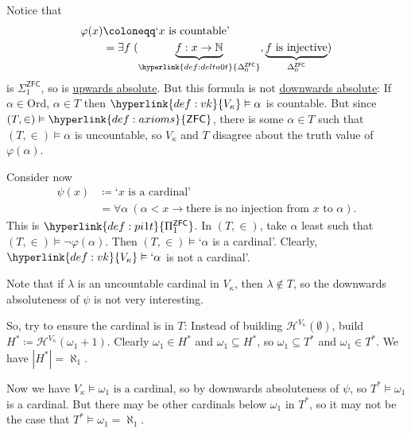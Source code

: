 \documentclass{article}
\newcommand{\1}{\mathbbm{1}}
\let\models\vDash
\begin{document}
Notice that
\begin{align*}
  \varphi(x) &\coloneqq \text{`}x \text{ is countable'} \\
             &= \exists f \; (\underbrace{f: x \to \mathbb{N}}_{\hyperlink{def:delta0t}{\Delta_0^{\textsf{ZFC}}}}, \underbrace{f \text{ is injective}}_{\Delta_0^\textsf{ZFC}})
\end{align*}
is \hyperlink{def:sig1t}{$\Sigma_1^{\textsf{ZFC}}$}, so is \hyperlink{def:abso}{upwards absolute}.
But this formula is not \hyperlink{def:abso}{downwards absolute}: If $\alpha \in \textrm{Ord}$, $\alpha \in T$ then $\hyperlink{def:vk}{V_\kappa} \models \alpha$ is countable.
But since $(T,\in) \models \hyperlink{def:axioms}{\textsf{ZFC}}$, there is some $\alpha \in T$ such that $(T,\in) \models \alpha$ is uncountable, so $V_\kappa$ and $T$ disagree about the truth value of $\varphi(\alpha)$.

Consider now
\begin{align*}
  \psi(x) &\coloneqq  \text{`}x \text{ is a cardinal'} \\
  &= \forall \alpha \ (\alpha < x \rightarrow \text{there is no injection from $x$ to $\alpha$}).
\end{align*}
This is $\hyperlink{def:pi1t}{\Pi_1^{\textsf{ZFC}}}$.
In $(T,\in)$, take $\alpha$ least such that $(T,\in) \models \neg\varphi(\alpha)$.
Then $(T,\in) \models \text{`}\alpha$ is a cardinal'. Clearly, $\hyperlink{def:vk}{V_\kappa} \models \text{`}\alpha$ is not a cardinal'.

Note that if  $\lambda$ is an uncountable cardinal in $V_\kappa$, then $\lambda \notin T$, so the downwards absoluteness of $\psi$ is not very interesting.

So, try to ensure the cardinal is in $T$: Instead of building $\mathcal{H}^{V_\kappa}(\emptyset)$, build $H^* \coloneqq \mathcal{H}^{V_\kappa}(\omega_1 + 1)$.
Clearly $\omega_1 \in H^*$ and $\omega_1 \subseteq H^*$, so $\omega_1 \subseteq T^*$ and $\omega_1 \in T^*$. We have $|H^*| = \aleph_1$.

Now we have $V_\kappa \models \omega_1 \text{ is a cardinal}$, so by downwards absoluteness of $\psi$, so $T^* \models \omega_1$ is a cardinal.
But there may be other cardinals below $\omega_1$ in $T^*$, so it may not be the case that $T^* \models \omega_1 = \aleph_1$.
\end{document}
